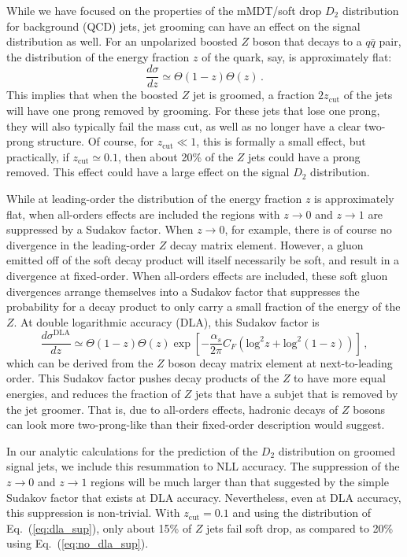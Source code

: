 \documentclass[a4paper,11pt]{article}
\def\log{\text{log}}
\def\zcut{z_{\text{cut}}}
\DeclareRobustCommand{\Eq}[1]{Eq.~(\ref{#1})}
\begin{document}
While we have focused on the properties of the mMDT/soft drop $D_2$ distribution for background (QCD) jets, jet grooming can have an effect on the signal distribution as well.  For an unpolarized boosted $Z$ boson that decays to a $q\bar q$ pair, the distribution of the energy fraction $z$ of the quark, say, is approximately flat:
\begin{equation}\label{eq:no_dla_sup}
\frac{d\sigma}{dz}\simeq \Theta(1-z)\Theta(z)\,.
\end{equation}
This implies that when the boosted $Z$ jet is groomed, a fraction $2\zcut$ of the jets will have one prong removed by grooming.  For these jets that lose one prong, they will also typically fail the mass cut, as well as no longer have a clear two-prong structure.  Of course, for $\zcut\ll 1$, this is formally a small effect, but practically, if $\zcut\simeq 0.1$, then about 20\% of the $Z$ jets could have a prong removed.  This effect could have a large effect on the signal $D_2$ distribution.

While at leading-order the distribution of the energy fraction $z$ is approximately flat, when all-orders effects are included the regions with $z\to 0$ and $z\to 1$ are suppressed by a Sudakov factor.  When $z\to 0$, for example, there is of course no divergence in the leading-order $Z$ decay matrix element.  However, a gluon emitted off of the soft decay product will itself necessarily be soft, and result in a divergence at fixed-order.  When all-orders effects are included, these soft gluon divergences arrange themselves into a Sudakov factor that suppresses the probability for a decay product to only carry a small fraction of the energy of the $Z$.  At double logarithmic accuracy (DLA), this Sudakov factor is
\begin{equation}\label{eq:dla_sup}
\frac{d\sigma^\text{DLA}}{dz}\simeq \Theta(1-z)\Theta(z)\exp\left[-\frac{\alpha_s}{2\pi}C_F\left(
\log^2z+\log^2(1-z)
\right)\right]\,,
\end{equation}
which can be derived from the $Z$ boson decay matrix element at next-to-leading order.  This Sudakov factor pushes decay products of the $Z$ to have more equal energies, and reduces the fraction of $Z$ jets that have a subjet that is removed by the jet groomer.  That is, due to all-orders effects, hadronic decays of $Z$ bosons can look more two-prong-like than their fixed-order description would suggest.

In our analytic calculations for the prediction of the $D_2$ distribution on groomed signal jets, we include this resummation to NLL accuracy.  The suppression of the $z\to 0$ and $z\to 1$ regions will be much larger than that suggested by the simple Sudakov factor that exists at DLA accuracy.  Nevertheless, even at DLA accuracy, this suppression is non-trivial.  With $\zcut=0.1$ and using the distribution of \Eq{eq:dla_sup}, only about 15\% of $Z$ jets fail soft drop, as compared to 20\% using \Eq{eq:no_dla_sup}.
\end{document}
